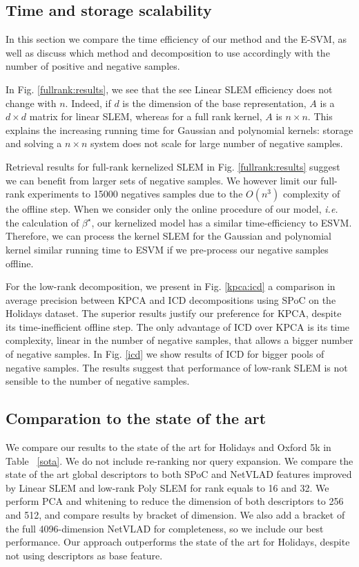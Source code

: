 


\subsection{Time and storage scalability} \label{time-scale}
In this section we compare the time efficiency of our method and the E-SVM, as well as discuss which method and decomposition to use accordingly with the number of positive and negative samples.

In Fig. \ref{fullrank:results}, we see that the see Linear SLEM efficiency does not change with $n$.
Indeed, if $d$ is the dimension of the base representation, $A$ is a $d\times d$ matrix for linear SLEM, whereas for a full rank kernel, $A$ is $n\times n$.
This explains the increasing running time for Gaussian and polynomial kernels: storage and solving a $n\times n$ system does not scale for large number of negative samples.

Retrieval results for full-rank kernelized SLEM in Fig. \ref{fullrank:results} suggest we can benefit from larger sets of negative samples. We however limit our full-rank experiments to 15000 negatives samples due to the $O(n^3)$ complexity of the offline step.
When we consider only the online procedure of our model, \emph{i.e.} the calculation of $\beta^\star$, our kernelized model has a similar time-efficiency to ESVM. Therefore, we can process the kernel SLEM for the Gaussian and polynomial kernel similar running time to ESVM if we pre-process our negative samples offline.

For the low-rank decomposition, we present in Fig. \ref{kpca:icd} a comparison in average precision between KPCA and ICD decompositions using SPoC on the Holidays dataset. The superior results justify our preference for KPCA, despite its time-inefficient offline step. The only advantage of ICD over KPCA is its time complexity, linear in the number of negative samples, that allows a bigger number of negative samples. In Fig. \ref{icd} we show results of ICD for bigger pools of negative samples. The results suggest that performance of low-rank SLEM is not sensible to the number of negative samples.




\vspace{3 mm}



\subsection{Comparation to the state of the art}
We compare our results to the state of the art for Holidays and Oxford 5k in Table ~\ref{sota}.  We do not include re-ranking nor query expansion. We compare the state of the art global descriptors to both SPoC and NetVLAD features improved by Linear SLEM and low-rank Poly SLEM for rank equals to 16 and 32. We perform PCA and whitening to reduce the dimension of both descriptors to 256 and 512, and compare results by bracket of dimension. We also add a bracket of the full 4096-dimension NetVLAD for completeness, so we include our best performance. Our approach outperforms the state of the art for Holidays, despite not using descriptors as base feature.

